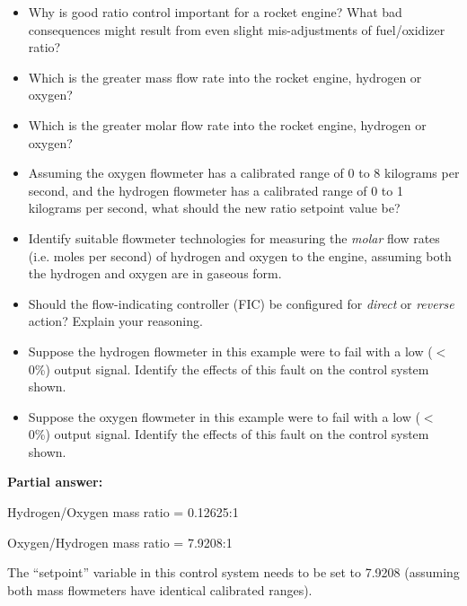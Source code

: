 \begin{itemize}
\item{} Why is good ratio control important for a rocket engine?  What bad consequences might result from even slight mis-adjustments of fuel/oxidizer ratio?
\item{} Which is the greater mass flow rate into the rocket engine, hydrogen or oxygen?
\item{} Which is the greater molar flow rate into the rocket engine, hydrogen or oxygen?
\item{} Assuming the oxygen flowmeter has a calibrated range of 0 to 8 kilograms per second, and the hydrogen flowmeter has a calibrated range of 0 to 1 kilograms per second, what should the new ratio setpoint value be?
\item{} Identify suitable flowmeter technologies for measuring the {\it molar} flow rates (i.e. moles per second) of hydrogen and oxygen to the engine, assuming both the hydrogen and oxygen are in gaseous form.
\item{} Should the flow-indicating controller (FIC) be configured for {\it direct} or {\it reverse} action?  Explain your reasoning.
\item{} Suppose the hydrogen flowmeter in this example were to fail with a low ($<$ 0\%) output signal.  Identify the effects of this fault on the control system shown.
\item{} Suppose the oxygen flowmeter in this example were to fail with a low ($<$ 0\%) output signal.  Identify the effects of this fault on the control system shown.
\end{itemize}







\noindent
{\bf Partial answer:}

\vskip 10pt

Hydrogen/Oxygen mass ratio = 0.12625:1

\vskip 10pt

Oxygen/Hydrogen mass ratio = 7.9208:1

\vskip 10pt

The ``setpoint'' variable in this control system needs to be set to 7.9208 (assuming both mass flowmeters have identical calibrated ranges).






